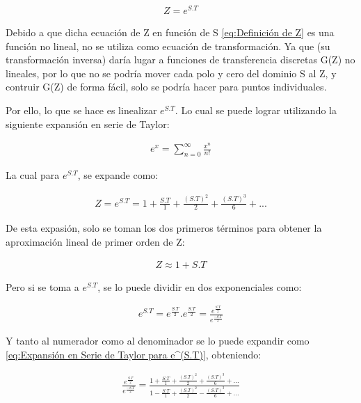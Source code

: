 \documentclass{article}
\begin{document}
\begin{sloppypar}
\begin{align}   \label{eq:Definición de Z}
    Z=e^{S.T}
\end{align}

Debido a que dicha ecuación de Z en función de S \ref{eq:Definición de Z} es una función no lineal, no se utiliza como ecuación de transformación. Ya que (su transformación inversa) daría lugar a funciones de transferencia discretas G(Z) no lineales, por lo que no se podría mover cada polo y cero del dominio S al Z, y contruir G(Z) de forma fácil, solo se podría hacer para puntos individuales.

Por ello, lo que se hace es linealizar $e^{S.T}$. Lo cual se puede lograr utilizando la siguiente expansión en serie de Taylor:

\begin{align}   \label{eq:Expansión en Serie de Taylor para e^x}
    e^x=\sum_{n=0}^{\infty}\frac{x^n}{n!}
\end{align}

La cual para $e^{S.T}$, se expande como:

\begin{align}   \label{eq:Expansión en Serie de Taylor para e^(S.T)}
    Z=e^{S.T}=1+\frac{S.T}{1}+\frac{\left(S.T\right)^2}{2}+\frac{\left(S.T\right)^3}{6}+...
\end{align}

De esta expasión, solo se toman los dos primeros términos para obtener la aproximación lineal de primer orden de Z:

\begin{align}   \label{eq:Aproximación Lineal de Z}
    Z \approx 1+S.T
\end{align}

Pero si se toma a $e^{S.T}$, se lo puede dividir en dos exponenciales como:

\begin{align}   \label{eq:Artificio Matemático}
    e^{S.T}=e^{\frac{S.T}{2}}.e^{\frac{S.T}{2}}=\frac{e^{\frac{S.T}{2}}}{e^{\frac{-S.T}{2}}}
\end{align}

Y tanto al numerador como al denominador se lo puede expandir como \ref{eq:Expansión en Serie de Taylor para e^(S.T)}, obteniendo:

\begin{align}   \label{eq:Mejor Aproximación}
    \frac{e^{\frac{S.T}{2}}}{e^{\frac{-S.T}{2}}}=\frac{1+\frac{S.T}{1}+\frac{\left(S.T\right)^2}{2}+\frac{\left(S.T\right)^3}{6}+...}{1-\frac{S.T}{1}+\frac{\left(S.T\right)^2}{2}-\frac{\left(S.T\right)^3}{6}+...}
\end{align}


\end{sloppypar}
\end{document}
